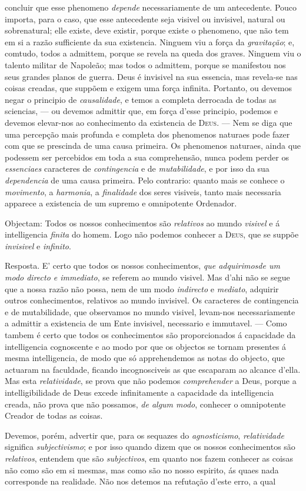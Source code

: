 concluir que esse phenomeno \emph{depende} necessariamente de um antecedente. Pouco importa, para o caso, que esse antecedente seja visivel ou invisivel, natural ou sobrenatural; elle existe, deve existir, porque existe o phenomeno, que não tem em si a razão sufficiente da sua existencia. Ninguem viu a força da \emph{gravitação}; e, comtudo, todos a admittem, porque se revela na queda dos graves. Ninguem viu o talento militar de Napoleão; mas todos o admittem, porque se manifestou nos seus grandes planos de guerra. Deus é invisivel na sua essencia, mas revela-se nas coisas creadas, que suppõem e exigem uma força infinita. Portanto, ou devemos negar o principio de \emph{causalidade}, e temos a completa derrocada de todas as sciencias, --- ou devemos admittir que, em força d'esse principio, podemos e devemos elevar-nos ao conhecimento da existencia de \textsc{Deus}. --- Nem se diga que uma percepção mais profunda e completa dos phenomenos naturaes pode fazer com que se prescinda de uma causa primeira. Os phenomenos naturaes, ainda que podessem ser percebidos em toda a sua comprehensão, nunca podem perder os \emph{essenciaes} caracteres de \emph{contingencia} e de \emph{mutabilidade}, e por isso da sua \emph{dependencia} de uma causa primeira. Pelo contrario: quanto mais se conhece o \emph{movimento}, a \emph{harmonia}, a \emph{finalidade} dos seres visiveis, tanto mais necessaria apparece a existencia de um supremo e omnipotente Ordenador.\par Objectam: Todos os nossos conhecimentos são \emph{relativos} ao mundo \emph{visivel} e á intelligencia \emph{finita} do homem. Logo não podemos conhecer a \textsc{Deus}, que se suppõe \emph{invisivel} e \emph{infinito}.\par Resposta. E' certo que todos os nossos conhecimentos, \emph{que adquirimos}\emph{de um modo directo e immediato}, se referem ao mundo visivel. Mas d'ahi não se segue que a nossa razão não possa, nem de um modo \emph{indirecto} e \emph{mediato}, adquirir outros conhecimentos, relativos ao mundo invisivel. Os caracteres de contingencia e de mutabilidade, que observamos no mundo visivel, levam-nos necessariamente a admittir a existencia de um Ente invisivel, necessario e immutavel. --- Como tambem é certo que todos os conhecimentos são proporcionados á capacidade da intelligencia cognoscente e ao modo por que os objectos se tornam presentes á mesma intelligencia, de modo que só apprehendemos as notas do objecto, que actuaram na faculdade, ficando incognosciveis as que escaparam ao alcance d'ella. Mas esta \emph{relatividade}, se prova que não podemos \emph{comprehender} a Deus, porque a intelligibilidade de Deus excede infinitamente a capacidade da intelligencia creada, não prova que não possamos, \emph{de algum modo}, conhecer o omnipotente Creador de todas as coisas.\par Devemos, porém, advertir que, para os sequazes do \emph{agnosticismo}, \emph{relatividade} significa \emph{subjectivismo}; e por isso quando dizem que os nossos conhecimentos são \emph{relativos}, entendem que são \emph{subjectivos}, em quanto nos fazem conhecer as coisas não como são em si mesmas, mas como são no nosso espirito, ás quaes nada corresponde na realidade. Não nos detemos na refutação d'este erro, a qual 